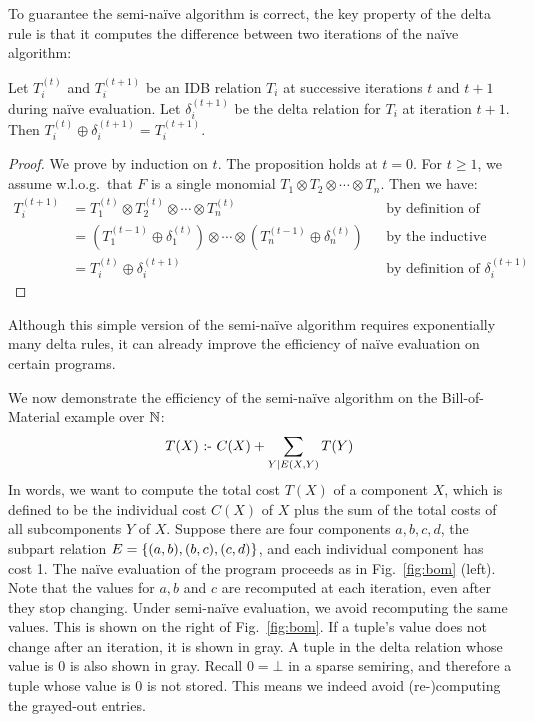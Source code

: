 To guarantee the semi-na\"ive algorithm is correct,
the key property of the delta rule is that it computes the difference
 between two iterations of the na\"ive algorithm:
%
\begin{prop}
\label{thm:delta}
Let $T_i^{(t)}$ and $T_i^{(t+1)}$ be an IDB relation $T_i$ 
 at successive iterations $t$ and $t+1$ during na\"ive evaluation.
Let $\delta_i^{(t+1)}$ be the delta relation for $T_i$ at iteration $t+1$.
Then $T_i^{(t)} \oplus \delta_i^{(t+1)} = T_i^{(t+1)}$.
\end{prop}
%
\begin{proof}
We prove by induction on $t$.
The proposition holds at $t=0$.
For $t\geq 1$, we assume w.l.o.g.\ that $F$ is a single monomial $T_1 \otimes T_2 \otimes \cdots \otimes T_n$.
Then we have:
\begin{align*}
T_i^{(t+1)} & = T_1^{(t)} \otimes T_2^{(t)} \otimes \cdots \otimes T_n^{(t)} && \text{by definition of na\"ive evaluation} \\ 
 & = (T_1^{(t-1)} \oplus \delta_1^{(t)}) \otimes \cdots \otimes (T_n^{(t-1)} \oplus \delta_n^{(t)}) && \text{by the inductive hypothesis} \\
 & = T_i^{(t)} \oplus \delta_i^{(t+1)} && \text{by definition of $\delta_i^{(t+1)}$}
\end{align*}
\end{proof}

Although this simple version of the semi-na\"ive algorithm requires exponentially
 many delta rules, it can already improve the efficiency of na\"ive evaluation
 on certain programs.

\begin{ex}
\label{ex:sn-datalogo}
We now demonstrate the efficiency of the semi-na\"ive algorithm on the Bill-of-Material example 
 over $\mathbb N$:
%
$$ T(X) \text{ :- } C(X) + \sum_{Y \mid E(X, Y)} T(Y) $$
%
In words, we want to compute the total cost $T(X)$ of a component $X$, 
 which is defined to be the individual cost $C(X)$ of $X$ 
 plus the sum of the total costs of all subcomponents $Y$ of $X$.
Suppose there are four components $a, b, c, d$, 
 the subpart relation $E = \{ (a, b), (b, c), (c, d)\}$, 
 and each individual component has cost 1.
The na\"ive evaluation of the program proceeds as in Fig.~\ref{fig:bom} (left).
Note that the values for $a, b$ and $c$ are recomputed at each iteration, 
 even after they stop changing.
Under semi-na\"ive evaluation, we avoid recomputing the same values.
This is shown on the right of Fig.~\ref{fig:bom}.
If a tuple's value does not change after an iteration, 
 it is shown in gray.
A tuple in the delta relation whose value is 0 is also shown in gray.
Recall $0 = \bot$ in a sparse semiring,
 and therefore a tuple whose value is 0 is not stored.
This means we indeed avoid (re-)computing the grayed-out entries.
\end{ex}

